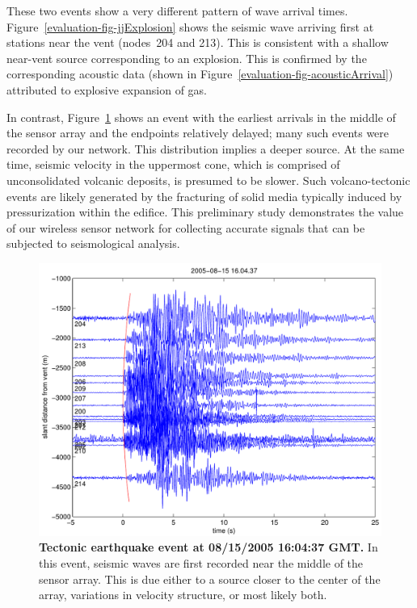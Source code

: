 These two events show a very different pattern of wave arrival times.
Figure~\ref{evaluation-fig-jjExplosion} shows the seismic wave arriving first
at stations near the vent (nodes~204 and 213). This is consistent with a
shallow near-vent source corresponding to an explosion. This is confirmed by
the corresponding acoustic data (shown in
Figure~\ref{evaluation-fig-acousticArrival}) attributed to explosive
expansion of gas. 

In contrast, Figure~\ref{evaluation-fig-jjTectonic} shows an event with the
earliest arrivals in the middle of the sensor array and the endpoints
relatively delayed; many such events were recorded by our network. This
distribution implies a deeper source. At the same time, seismic velocity in
the uppermost cone, which is comprised of unconsolidated volcanic deposits,
is presumed to be slower. Such volcano-tectonic events are likely generated
by the fracturing of solid media typically induced by pressurization within
the edifice. This preliminary study demonstrates the value of our wireless
sensor network for collecting accurate signals that can be subjected to
seismological analysis.

\begin{figure}[t!]
\begin{center}
\includegraphics[width=0.8\hsize]{./3-evaluation/figs/fidelity/seismicArrival/johnson/2005-08-15_16-04-37.pdf}
\end{center}
\caption{\textbf{Tectonic earthquake event at 08/15/2005 16:04:37 GMT.}
In this event, seismic waves are first recorded near the middle of the sensor
array. This is due either to a source closer to the center of the array,
variations in velocity structure, or most likely both.}
\label{evaluation-fig-jjTectonic}
\end{figure}
